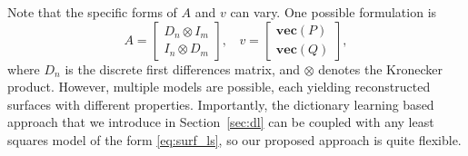 Note that the specific forms of $A$ and $v$ can vary. One possible formulation is
\begin{equation}
A = \begin{bmatrix}
D_n \otimes I_m \\
I_n \otimes D_m
\end{bmatrix}, \ \ \ \ v = \begin{bmatrix}
\textbf{vec}(P) \\
\textbf{vec}(Q)
\end{bmatrix},
\end{equation}
where $D_n$ is the discrete first differences matrix, and $\otimes$ denotes the Kronecker product. However, multiple models are possible, each yielding reconstructed surfaces with different properties. Importantly, the dictionary learning based approach that we introduce in Section~\ref{sec:dl} can be coupled with any least squares model of the form \eqref{eq:surf_ls}, so our proposed approach is quite flexible.






